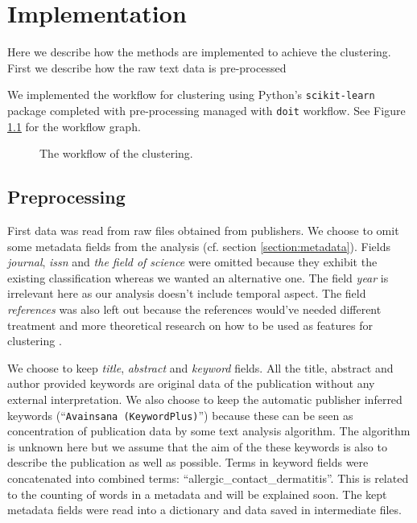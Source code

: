 \chapter{Implementation}
\label{chapter:implementation}


Here we describe how the methods are implemented to achieve the 
clustering. First we describe how the raw text data is 
pre-processed 

We implemented the workflow for clustering using Python's 
\texttt{scikit-learn} package completed with 
pre-processing managed with \texttt{doit} workflow. See Figure 
\ref{fig:wf} for the workflow graph.

\begin{figure}[ht]
  \begin{center}    
    
    \caption{The workflow of the clustering.}
    \label{fig:wf}
  \end{center}
\end{figure}

\section{Preprocessing}
First data was read from raw files obtained from publishers. 
We choose to omit some metadata fields from the analysis (cf. 
section \ref{section:metadata}). Fields \emph{journal}, 
\emph{issn} and \emph{the field of science} were omitted because 
they exhibit the existing classification whereas we wanted an 
alternative one. The field \emph{year} is irrelevant here as our 
analysis doesn't include temporal aspect. The field 
\emph{references} was also left out because the references 
would've needed different treatment and more theoretical research 
on how to be used as features for clustering .

We choose to keep \emph{title}, \emph{abstract} and 
\emph{keyword} fields. All the title, abstract and author 
provided keywords are original data of the publication without 
any external interpretation. We also choose to keep the automatic 
publisher inferred keywords (``\texttt{Avainsana 
(KeywordPlus)}'') because these can be seen as concentration of 
publication data by some text analysis algorithm. The algorithm is 
unknown here but we assume that the aim of the these keywords is 
also to describe the publication as well as possible. 
 Terms in keyword fields were 
concatenated into combined terms: 
``allergic\_contact\_dermatitis''. This is related to the counting 
of words in a metadata and will be explained soon. The kept 
metadata fields were read into a dictionary and data saved in 
intermediate files.

